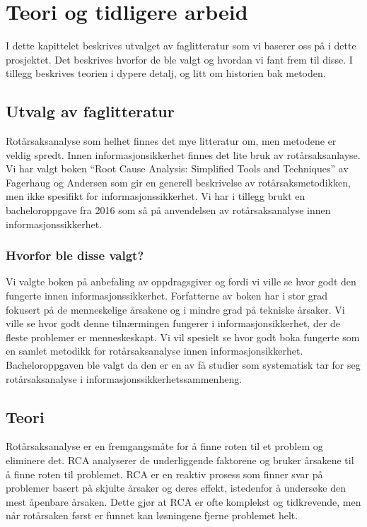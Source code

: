 \chapter{Teori og tidligere arbeid}
\label{kap:teori}
I dette kapittelet beskrives utvalget av faglitteratur som vi baserer oss på i dette prosjektet. Det beskrives hvorfor de ble valgt og hvordan vi fant frem til disse. I tillegg beskrives teorien i dypere detalj, og litt om historien bak metoden. 

\section{Utvalg av faglitteratur}
Rotårsaksanalyse som helhet finnes det mye litteratur om, men metodene er veldig spredt. Innen informasjonsikkerhet finnes det lite bruk av rotårsaksanlayse. Vi har valgt boken ``Root Cause Analysis: Simplified Tools and Techniques'' av Fagerhaug og Andersen \cite{RCA} som gir en generell beskrivelse av rotårsaksmetodikken, men ikke spesifikt for informasjonssikkerhet. Vi har i tillegg brukt en bacheloroppgave fra 2016 \cite{RCARapport} som så på anvendelsen av rotårsaksanalyse innen informasjonssikkerhet.

\subsection{Hvorfor ble disse valgt?}
Vi valgte boken \cite{RCA} på anbefaling av oppdragsgiver og fordi vi ville se hvor godt den fungerte innen informasjonssikkerhet. Forfatterne av boken \cite{RCA} har i stor grad fokusert på de menneskelige årsakene og i mindre grad på tekniske årsaker. Vi ville se hvor godt denne tilnærmingen fungerer i informasjonsikkerhet, der de fleste problemer er menneskeskapt. Vi vil spesielt se hvor godt boka fungerte som en samlet metodikk for rotårsaksanalyse innen informasjonsikkerhet. Bacheloroppgaven \cite{RCARapport} ble valgt da den er en av få studier som systematisk tar for seg rotårsaksanalyse i informasjonssikkerhetssammenheng. 

\section{Teori}
Rotårsaksanalyse er en fremgangsmåte for å finne roten til et problem og eliminere det. RCA analyserer de underliggende faktorene og bruker årsakene til å finne roten til problemet. RCA er en reaktiv prosess som finner svar på problemer basert på skjulte årsaker og deres effekt, istedenfor å undersøke den mest åpenbare årsaken. Dette gjør at RCA er ofte komplekst og tidkrevende, men når rotårsaken først er funnet kan løsningene fjerne problemet helt. 

